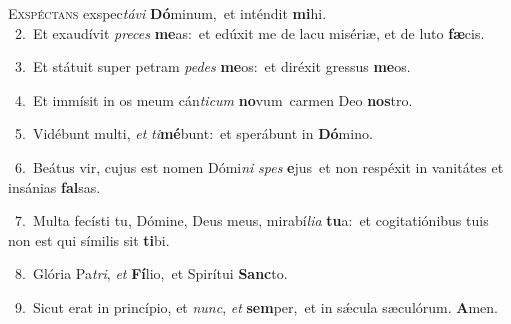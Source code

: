 \lettrine{\initial\textcolor{\initialcolor}{E}}{xspéctans} exspec\-\textit{tá}\-\textit{vi} \textbf{Dó}\-minum,~\star et inténdit \textbf{mi}\-hi.\\
{\numbfont\textcolor{\numbcolor}{~2.}}~Et exaudívit \textit{pre}\-\textit{ces} \textbf{me}\-as:~\star et edúxit me de lacu misériæ, et de luto \textbf{fæ}\-cis.\par
{\numbfont\textcolor{\numbcolor}{~3.}}~Et státuit super petram \textit{pe}\-\textit{des} \textbf{me}\-os:~\star et diréxit gressus \textbf{me}\-os.\par
{\numbfont\textcolor{\numbcolor}{~4.}}~Et immísit in os meum cán\-\textit{ti}\-\textit{cum} \textbf{no}\-vum~\star carmen Deo \textbf{nos}\-tro.\par
{\numbfont\textcolor{\numbcolor}{~5.}}~Vidébunt multi, \textit{et} \textit{ti}\-\textbf{mé}bunt:~\star et sperábunt in \textbf{Dó}\-mino.\par
{\numbfont\textcolor{\numbcolor}{~6.}}~Beátus vir, cujus est nomen Dómi\textit{ni} \textit{spes} \textbf{e}\-jus~\star et non respéxit in vanitátes et insánias \textbf{fal}\-sas.\par
{\numbfont\textcolor{\numbcolor}{~7.}}~Multa fecísti tu, Dómine, Deus meus, mirabí\-\textit{li}\-\textit{a} \textbf{tu}\-a:~\star et cogitatiónibus tuis non est qui símilis sit \textbf{ti}\-bi.\par
{\numbfont\textcolor{\numbcolor}{~8.}}~Glória Pa\-\textit{tri}\-, \textit{et} \textbf{Fí}\-lio,~\star et Spirítui \textbf{Sanc}\-to.\par
{\numbfont\textcolor{\numbcolor}{~9.}}~Sicut erat in princípio, et \textit{nunc}\-, \textit{et} \textbf{sem}\-per,~\star et in sǽcula sæculórum. \textbf{A}\-men.\par
